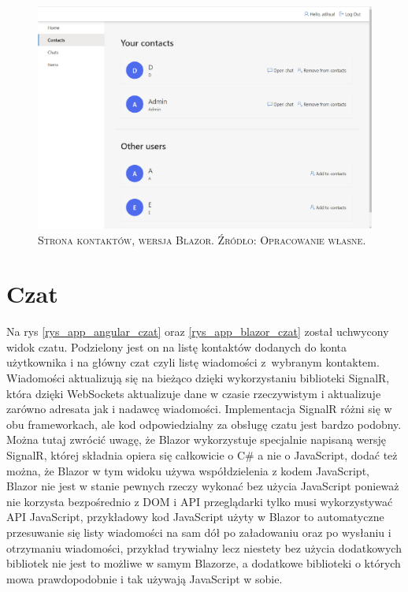 \documentclass[12pt,a4paper,oneside]{book}
\newcommand{\captionT}[1]{\caption{\textsc{\footnotesize{#1}}}}
\begin{document}
\begin{figure}[H]
\centering
\includegraphics[width=1\textwidth]{images/BlazorApp/BlazorKontakty.pdf}
\captionT{Strona kontaktów,  wersja Blazor. Źródło: Opracowanie własne.}
\label{rys_app_blazor_kontakty}
\end{figure}

\section{Czat}

Na rys \ref{rys_app_angular_czat} oraz \ref{rys_app_blazor_czat} został uchwycony widok czatu. Podzielony jest on na listę kontaktów dodanych do konta użytkownika i na główny czat czyli listę wiadomości z~wybranym kontaktem. Wiadomości aktualizują się na bieżąco dzięki wykorzystaniu biblioteki SignalR, która dzięki WebSockets aktualizuje dane w czasie rzeczywistym i aktualizuje zarówno adresata jak i nadawcę wiadomości. Implementacja SignalR różni się w obu frameworkach, ale kod odpowiedzialny za obsługę czatu jest bardzo podobny. Można tutaj zwrócić uwagę, że Blazor wykorzystuje specjalnie napisaną wersję SignalR, której składnia opiera się całkowicie o C\# a nie o JavaScript, dodać też można, że Blazor w tym widoku używa współdzielenia z kodem JavaScript, Blazor nie jest w stanie pewnych rzeczy wykonać bez użycia JavaScript ponieważ nie korzysta bezpośrednio z DOM i API przeglądarki tylko musi wykorzystywać API JavaScript, przykładowy kod JavaScript użyty w Blazor to automatyczne przesuwanie się listy wiadomości na sam dół po załadowaniu oraz po wysłaniu i otrzymaniu wiadomości, przykład trywialny lecz niestety bez użycia dodatkowych bibliotek nie jest to możliwe w samym Blazorze, a dodatkowe biblioteki o których mowa prawdopodobnie i tak używają JavaScript w sobie.
\end{document}
